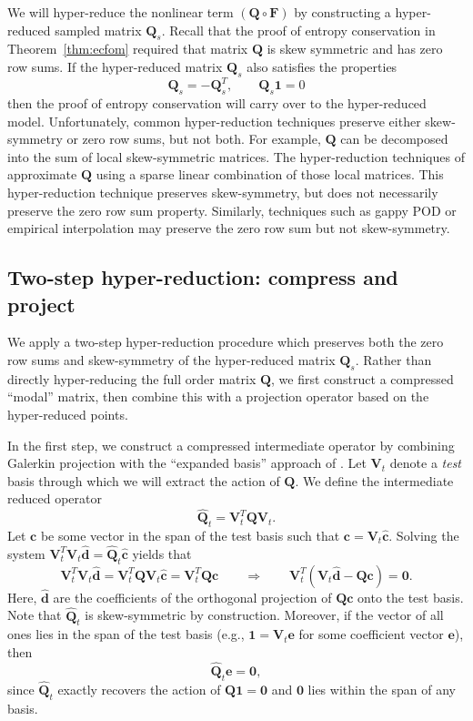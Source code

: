 \documentclass[preprint,10pt]{elsarticle}
\theoremstyle{definition}
\theoremstyle{lemma}
\theoremstyle{theorem}
\theoremstyle{assumption}
\renewcommand{\hat}{\widehat}
\newcommand{\LRp}[1]{\left( #1 \right)}
\begin{document}
We will hyper-reduce the nonlinear term $\LRp{\bm{Q}\circ \bm{F}}$ by constructing a hyper-reduced sampled matrix $\bm{Q}_s$.  Recall that the proof of entropy conservation in Theorem~\ref{thm:ecfom} required that matrix $\bm{Q}$ is skew symmetric and has zero row sums.  If the hyper-reduced matrix $\bm{Q}_s$ also satisfies the properties
\[
\bm{Q}_s = -\bm{Q}_s^T, \qquad \bm{Q}_s\bm{1} = 0
\]
then the proof of entropy conservation will carry over to the hyper-reduced model.  Unfortunately, common hyper-reduction techniques preserve either skew-symmetry or zero row sums, but not both.  For example, $\bm{Q}$ can be decomposed into the sum of local skew-symmetric matrices.  The hyper-reduction techniques of \cite{farhat2015structure, yano2019discontinuous} approximate $\bm{Q}$ using a sparse linear combination of those local matrices.  This hyper-reduction technique preserves skew-symmetry, but does not necessarily preserve the zero row sum property.  Similarly, techniques such as gappy POD or empirical interpolation \cite{everson1995karhunen, barrault2004empirical, chaturantabut2010nonlinear} may preserve the zero row sum but not skew-symmetry.  

\subsection{Two-step hyper-reduction: compress and project}

We apply a two-step hyper-reduction procedure which preserves both the zero row sums and skew-symmetry of the hyper-reduced matrix $\bm{Q}_s$.  Rather than directly hyper-reducing the full order matrix $\bm{Q}$, we first construct a compressed ``modal'' matrix, then combine this with a projection operator based on the hyper-reduced points.  

In the first step, we construct a compressed intermediate operator by combining  Galerkin projection with the ``expanded basis'' approach of \cite{hernandez2017dimensional}.  Let $\bm{V}_t$ denote a \textit{test} basis through which we will extract the action of $\bm{Q}$.  We define the intermediate reduced operator 
\begin{equation}
\hat{\bm{Q}}_{t} = \bm{V}_{t}^T\bm{Q}\bm{V}_{t}.
\label{eq:compressQ}
\end{equation}
Let $\bm{c}$ be some vector in the span of the test basis such that $\bm{c}=\bm{V}_t \hat{\bm{c}}$. Solving the system $\bm{V}_t^T\bm{V}_t \hat{\bm{d}} = \hat{\bm{Q}}_t\hat{\bm{c}}$ yields that
\[
\bm{V}_t^T\bm{V}_t \hat{\bm{d}} = \bm{V}_t^T\bm{Q}\bm{V}_t\hat{\bm{c}} = \bm{V}_t^T\bm{Q}\bm{c} \qquad \Longrightarrow\qquad \bm{V}_t^T \LRp{\bm{V}_t\hat{\bm{d}}-\bm{Q}\bm{c}} = \bm{0}.
\]
Here, $\hat{\bm{d}}$ are the coefficients of the orthogonal projection of $\bm{Q}\bm{c}$ onto the test basis.  Note that $\hat{\bm{Q}}_t$ is skew-symmetric by construction.  Moreover, if the vector of all ones lies in the span of the test basis (e.g., $\bm{1} = \bm{V}_t\bm{e}$ for some coefficient vector $\bm{e}$), then 
\[
\hat{\bm{Q}}_t\bm{e} = \bm{0},
\]
since $\hat{\bm{Q}}_t$ exactly recovers the action of $\bm{Q}\bm{1} = \bm{0}$ and $\bm{0}$ lies within the span of any basis.  
\end{document}
